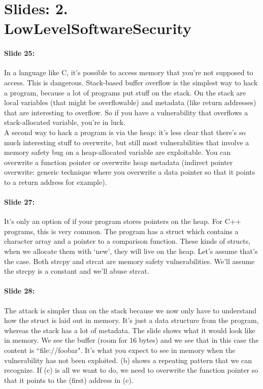 \documentclass[10pt,a4paper]{report}
\begin{document}
\section{Slides: 2. LowLevelSoftwareSecurity}

\paragraph{Slide 25:} In a language like C, it's possible to access memory that you're not supposed to access. This is dangerous.
Stack-based buffer overflow is the simplest way to hack a program, because a lot of programs put stuff on the stack. On the stack are local variables (that might be overflowable) and metadata (like return addresses) that are interesting to overflow. So if you have a vulnerability that overflows a stack-allocated variable, you're in luck.\\
A second way to hack a program is via the heap: it's less clear that there's so much interesting stuff to overwrite, but still most vulnerabilities that involve a memory safety bug on a heap-allocated variable are exploitable. You can overwrite a function pointer or overwrite heap metadata (indirect pointer overwrite: generic technique where you overwrite a data pointer so that it points to a return address for example).

\paragraph{Slide 27:} It's only an option of if your program stores pointers on the heap. For C++ programs, this is very common. The program has a struct which contains a character array and a pointer to a comparison function.
These kinds of structs, when we allocate them with `new', they will live on the heap. Let's assume that's the case. Both strcpy and strcat are memory safety vulnerabilities. We'll assume the strcpy is a constant and we'll abuse strcat.

\paragraph{Slide 28:} The attack is simpler than on the stack because we now only have to understand how the struct is laid out in memory. It's just a data structure from the program, whereas the stack has a lot of metadata.
The slide shows what it would look like in memory. We see the buffer (room for 16 bytes) and we see that in this case the content is ``file://foobar". It's what you expect to see in memory when the vulnerability has not been exploited. (b) shows a repeating pattern that we can recognize. If (c) is all we want to do, we need to overwrite the function pointer so that it points to the (first) address in (c).
\end{document}
